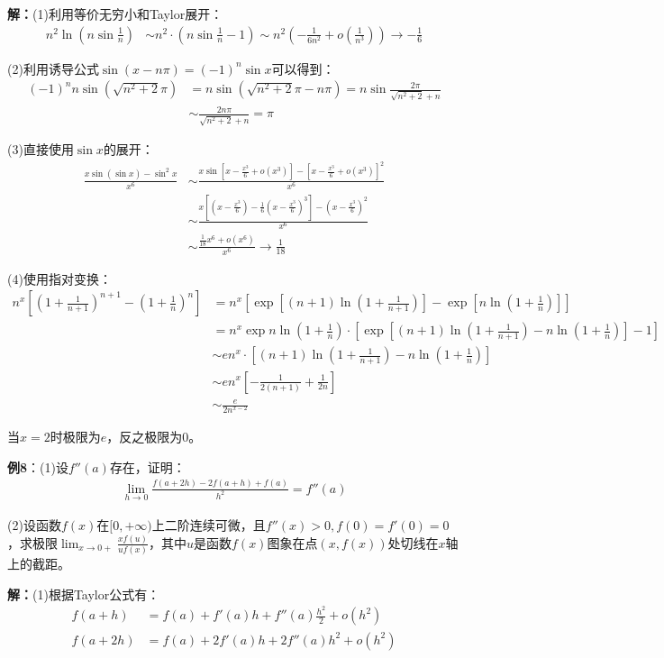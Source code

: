 \documentclass{ctexart}
\let\oldtextbf\textbf %
\renewcommand{\textbf}[1]{\textcolor{btex}{\oldtextbf{#1}}} %
\begin{document}
\textbf{解：}(1)利用等价无穷小和Taylor展开：
\begin{align*}
n^2\ln(n\sin\frac{1}{n})&\sim n^2\cdot(n\sin\frac{1}{n}-1)\sim n^2(-\frac{1}{6n^2}+o(\frac{1}{n^3}))\to -\frac{1}{6}    
\end{align*}

(2)利用诱导公式$\sin(x-n\pi)=(-1)^n\sin x$可以得到：
\begin{align*}
(-1)^n n\sin(\sqrt{n^2+2}\pi)&=n\sin(\sqrt{n^2+2}\pi-n\pi)=n\sin\frac{2\pi}{\sqrt{n^2+2}+n } \\
&\sim \frac{2n\pi}{\sqrt{n^2+2}+n}=\pi    
\end{align*}

(3)直接使用$\sin x$的展开：
\begin{align*}
\frac{x\sin(\sin x)-\sin^2x}{x^6}&\sim\frac{x\sin\left[x-\frac{x^3}{6}+o(x^3)\right]
-\left[x-\frac{x^3}{6}+o(x^3)\right]^2}{x^6}\\
  &\sim \frac{x\left[(x-\frac{x^3}{6})-\frac{1}{6} (x-\frac{x^3}{6})^3\right]- 
(x-\frac{x^3}{6})^2}{x^6}  \\
&\sim \frac{\frac{1}{18}x^6+o(x^6) }{x^6}\to\frac{1}{18}  
\end{align*}

(4)使用指对变换：
\begin{align*}
n^x\left[(1+\frac{1}{n+1})^{n+1} -(1+\frac{1}{n})^n \right]&=n^x\left[\exp
\left[(n+1)\ln(1+\frac{1}{n+1})\right]-\exp
\left[n\ln(1+\frac{1}{n})\right]\right] \\
&= n^x \exp n\ln(1+\frac{1}{n})\cdot \left[\exp
\left[(n+1)\ln(1+\frac{1}{n+1})- n\ln(1+\frac{1}{n})\right]-1\right] \\
&\sim en^x\cdot \left[(n+1)\ln(1+\frac{1}{n+1})-n\ln(1+\frac{1}{n}) \right]\\
&\sim en^x[-\frac{1}{2(n+1)}+\frac{1}{2n}]\\
&\sim \frac{e}{2n^{x-2}} 
\end{align*}

当$x=2$时极限为$e$，反之极限为$0$。

\textbf{例8}：(1)设$f''(a)$存在，证明：
\begin{align*}
    \lim_{h\to 0}\frac{f(a+2h)-2f(a+h)+f(a)}{h^2}=f''(a)
\end{align*}

(2)设函数$f(x)$在$[0,+\infty)$上二阶连续可微，且$f''(x)>0,f(0)=f'(0)=0$，求极限$\lim_{x\to 0+}\frac{xf(u)}{uf(x)}$，其中$u$是函数$f(x)$图象在点$(x,f(x))$处切线在$x$轴上的截距。

\textbf{解：}(1)根据Taylor公式有：
\begin{align*}
    f(a+h)&=f(a)+f'(a)h+f''(a)\frac{h^2}{2}+o(h^2)\\
    f(a+2h)&=f(a)+2f'(a)h+2f''(a)h^2+o(h^2)
\end{align*}
\end{document}
